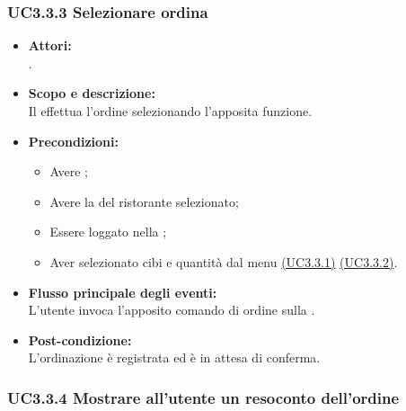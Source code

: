 \subsubsection{UC3.3.3 Selezionare ordina} \label{UC3.3.3}

\begin{itemize}
	\item \textbf{Attori:}
	\\.
	\item \textbf{Scopo e descrizione:} 
	\\Il {} effettua l'ordine selezionando l'apposita funzione.
	\item \textbf{Precondizioni:}
	\begin{itemize}
		\item Avere ;
		\item Avere la  del ristorante selezionato;
		\item Essere loggato nella ;
		\item Aver selezionato cibi e quantità dal menu \hyperref[UC3.3.1]{(UC3.3.1)} \hyperref[UC3.3.2]{(UC3.3.2)}.
	\end{itemize}
	\item \textbf{Flusso principale degli eventi:}
	\\L'utente invoca l'apposito comando di ordine sulla .
	\item \textbf{Post-condizione:}
	\\L'ordinazione è registrata ed è in attesa di conferma.
\end{itemize}

\subsubsection{UC3.3.4 Mostrare all'utente un resoconto dell'ordine} \label{UC3.3.4}

